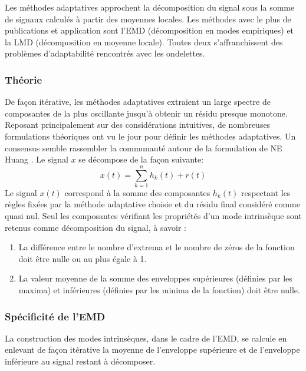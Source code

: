 
Les méthodes adaptatives approchent la décomposition du signal sous la somme de signaux calculés à partir des moyennes locales. Les méthodes avec le plus de publications et application sont l'EMD (décomposition en modes empiriques) et la LMD (décomposition en moyenne locale). Toutes deux s'affranchissent des problèmes d'adaptabilité rencontrés avec les ondelettes. 


\subsubsection{Théorie}
De façon itérative, les méthodes adaptatives extraient un large spectre de composantes de la plus oscillante jusqu'à obtenir un résidu presque monotone. Reposant principalement sur des considérations intuitives, de nombreuses formulations théoriques ont vu le jour pour définir les méthodes adaptatives. Un consensus semble rassembler la communauté autour de la formulation de NE Huang \cite{EMD-maths}. Le signal $x$ se décompose de la façon suivante:  
\begin{equation}
x(t) = \sum_{k=1}^{n}{h_k(t)} + r(t)
\end{equation}
Le signal $x(t)$ correspond à la somme des composantes $h_k(t)$ respectant les règles fixées par la méthode adaptative choisie et du résidu final considéré comme quasi nul. Seul les composantes vérifiant les propriétés d'un mode intrinsèque sont retenus comme décomposition du signal, à savoir \cite{NAM}: 
\begin{enumerate}
\item La différence entre le nombre d’extrema et le nombre de zéros de la fonction doit être nulle ou au plus égale à 1. 
\item La valeur moyenne de la somme des enveloppes supérieures (définies par les maxima) et inférieures (définies par les minima de la fonction) doit être nulle.
\end{enumerate}


\subsubsection{Spécificité de l'EMD}

La construction des modes intrinsèques, dans le cadre de l'EMD, se calcule en enlevant de façon itérative la moyenne de l'enveloppe supérieure et de l'enveloppe inférieure au signal restant à décomposer.  

